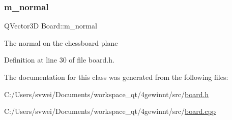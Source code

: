 \mbox{\label{class_board_ae13a36a59b726081033e3ffc158bb82a}} 
\subsubsection{\texorpdfstring{m\_normal}{m\_normal}}
{\footnotesize\ttfamily Q\+Vector3D Board\+::m\+\_\+normal\hspace{0.3cm}{\ttfamily [protected]}}

The normal on the chessboard plane 

Definition at line 30 of file board.\+h.



The documentation for this class was generated from the following files\+:\begin{DoxyCompactItemize}
\item 
C\+:/\+Users/svwei/\+Documents/workspace\+\_\+qt/4gewinnt/src/\mbox{\hyperlink{board_8h}{board.\+h}}\item 
C\+:/\+Users/svwei/\+Documents/workspace\+\_\+qt/4gewinnt/src/\mbox{\hyperlink{board_8cpp}{board.\+cpp}}\end{DoxyCompactItemize}
